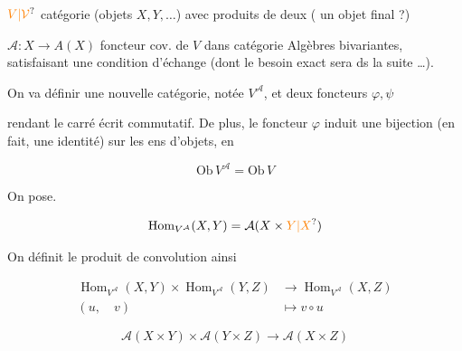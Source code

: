 $\unsure{V|\mathcal V}$ catégorie (objets $X,Y,\ldots$) avec produits de deux  ( un objet final ?)

$\mathcal A\colon X\to A(X)$ foncteur cov. de $V$ dans  catégorie   Algèbres  bivariantes, satisfaisant une condition d'échange    (dont le besoin exact sera  ds la suite \ldots).

On va définir une nouvelle catégorie, notée $V^{\mathcal A}$, et deux foncteurs $\varphi,\psi$


rendant le carré écrit commutatif. De plus, le foncteur $\varphi$ induit une bijection (en fait, une identité) sur les ens d'objets, en  

\[
\mathrm{Ob}\,V^{\mathcal A}=\mathrm{Ob}\,V
\]

On pose.

\[
\operatorname{Hom}_{V^{\mathcal A}}(X,Y)=\mathcal A(X\times \unsure{Y|X})
\]

On définit le produit de convolution ainsi

\[
\begin{aligned}
\operatorname{Hom}_{V^{\mathcal A}}(X,Y)\times\operatorname{Hom}_{V^{\mathcal A}}(Y,Z)&\longrightarrow\operatorname{Hom}_{V^{\mathcal A}}(X,Z)\\
(u,\quad v)&\longmapsto v\circ u
\end{aligned}
\]

\[
\mathcal A(X\times Y)\times\mathcal A(Y\times Z)\longrightarrow\mathcal A(X\times Z)
\]


